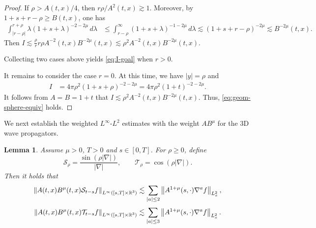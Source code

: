 \documentclass[11pt,twoside]{article}
\def\R{\mathop{\mathbb R\kern 0pt}\nolimits}
\def\ls{\lesssim}
\theoremstyle{plain}
\newtheorem{lemma}[theorem]{Lemma}
\theoremstyle{definition}
\theoremstyle{assumption}
\numberwithin{equation}{section}
\begin{document}
\begin{proof}
		
		If $\rho>A(t,x)/4$, then $r\rho/A^2(t,x)\gtrsim1$.
		Moreover, by $1+s+r-\rho\ge B(t,x) $, one has
		\begin{equation*}
			\begin{aligned}
				\int_{|r-\rho|}^{r+\rho} \lambda(1+s+\lambda)^{-2-2\mu}\,d\lambda
				&\le
				\int_{r-\rho}^\infty (1+s+\lambda)^{-1-2\mu}\,d\lambda\ls
				(1+s+r-\rho)^{-2\mu}
				\ls B^{-2\mu}(t,x).
			\end{aligned}
		\end{equation*}
		Then $I\ls \frac{\rho}{r} r\rho A^{-2}(t,x) B^{-2\mu}(t,x)
			\ls \rho^2 A^{-2}(t,x)B^{-2\mu}(t,x)$.
		
		
		Collecting two cases above yields \eqref{eq:I-goal} when $r>0$.
		
		It remains to consider the case $r=0$. At this time, we have $|y|=\rho$ and
		\begin{equation*}
			\begin{aligned}
				I
				&=
				4\pi\rho^2(1+s+\rho)^{-2-2\mu}
				=
				4\pi\rho^2(1+t)^{-2-2\mu}.
			\end{aligned}
		\end{equation*}
		It follows from $A=B=1+t$ that
		$I\ls\rho^2 A^{-2}(t,x)B^{-2\mu}(t,x)$.
		Thus, \eqref{eq:geom-sphere-equiv} holds.
	\end{proof}
	
	
	We next establish the weighted $L^\infty$-$L^2$ estimates with the weight $AB^\mu$ for the 3D wave propagators.
	
	
	\begin{lemma}\label{lem:weighted-wave-propagators}
		Assume $\mu>0$, $T>0$ and $s\in[0,T]$.
		For $\rho\ge0$, define
		\begin{equation*}
			\mathcal{S}_{\rho}
			=\frac{\sin(\rho|\nabla|)}{|\nabla|},
			\qquad
			\mathcal{T}_{\rho}
			=\cos(\rho|\nabla|).
		\end{equation*}
		Then it holds that
		\begin{equation}
			\label{eq:Srho-basic-w}
			\left\|
			A(t,x)B^\mu(t,x)
			\mathcal{S}_{t-s}f
			\right\|_{L^\infty([s,T]\times\R^3)}
			\ls
			\sum_{|a|\le2}
			\left\|
			A^{1+\mu}(s,\cdot)\nabla^a f
			\right\|_{L^2_x},
		\end{equation}
		\begin{equation}
			\label{eq:dt-Srho-basic-w}
			\left\|
			A(t,x)B^\mu(t,x)
			\mathcal{T}_{t-s}f
			\right\|_{L^\infty([s,T]\times\R^3)}
			\lesssim
			\sum_{|a|\le3}
			\left\|
			A^{1+\mu}(s,\cdot)\nabla^a f
			\right\|_{L^2_x}.
		\end{equation}
	\end{lemma}
	
\end{document}

